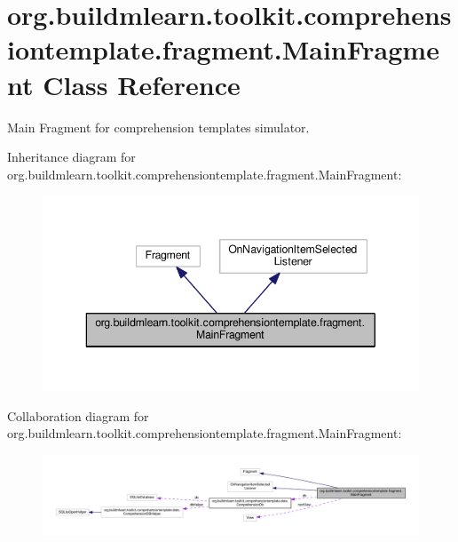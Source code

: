\hypertarget{classorg_1_1buildmlearn_1_1toolkit_1_1comprehensiontemplate_1_1fragment_1_1MainFragment}{}\section{org.\+buildmlearn.\+toolkit.\+comprehensiontemplate.\+fragment.\+Main\+Fragment Class Reference}
\label{classorg_1_1buildmlearn_1_1toolkit_1_1comprehensiontemplate_1_1fragment_1_1MainFragment}


Main Fragment for comprehension template\textquotesingle{}s simulator.  




Inheritance diagram for org.\+buildmlearn.\+toolkit.\+comprehensiontemplate.\+fragment.\+Main\+Fragment\+:
\nopagebreak
\begin{figure}[H]
\begin{center}
\leavevmode
\includegraphics[width=343pt]{classorg_1_1buildmlearn_1_1toolkit_1_1comprehensiontemplate_1_1fragment_1_1MainFragment__inherit__graph}
\end{center}
\end{figure}


Collaboration diagram for org.\+buildmlearn.\+toolkit.\+comprehensiontemplate.\+fragment.\+Main\+Fragment\+:
\nopagebreak
\begin{figure}[H]
\begin{center}
\leavevmode
\includegraphics[width=350pt]{classorg_1_1buildmlearn_1_1toolkit_1_1comprehensiontemplate_1_1fragment_1_1MainFragment__coll__graph}
\end{center}
\end{figure}

